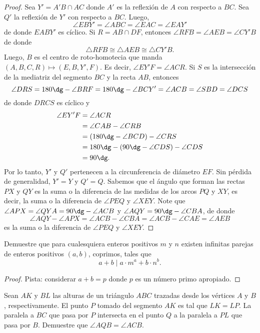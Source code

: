 \begin{proof}
	Sea $Y'=A'B\cap AC$ donde $A'$ es la reflexión de $A$ con respecto a $BC$. Sea $Q'$ la reflexión de $Y'$ con respecto a $BC$. Luego,
	\[\angle EBY'=\angle ABC=\angle EAC=\angle EAY'\]
	de donde $EABY'$ es cíclico. Si $R=AB\cap DF$, entonces $\angle RFB=\angle AEB=\angle CY'B$ de donde
	\[\triangle RFB\cong\triangle AEB\cong\triangle CY'B.\]
	Luego, $B$ es el centro de roto-homotecia que manda $(A,B,C,R)\mapsto(E,B,Y',F)$. Es decir, $\angle EY'F=\angle ACR$. Si $S$ es la intersección de la mediatriz del segmento $BC$ y la recta $AB$, entonces
	\[\angle DRS=180\dg-\angle BRF=180\dg-\angle BCY'=\angle ACB=\angle SBD=\angle DCS\]
	de donde $DRCS$ es cíclico y
	\begin{align*}
		\angle EY'F
		&=\angle ACR\\
		&=\angle CAB-\angle CRB\\
		&=(180\dg-\angle BCD)-\angle CRS\\
		&=180\dg-(90\dg-\angle CDS)-\angle CDS\\
		&=90\dg.
	\end{align*}
	Por lo tanto, $Y'$ y $Q'$ pertenecen a la circunferencia de diámetro $EF$. Sin pérdida de generalidad, $Y'=Y$ y $Q'=Q$. Sabemos que el ángulo que forman las rectas $PX$ y $QY$ es la suma o la diferencia de las medidas de los arcos $PQ$ y $XY$, es decir, la suma o la diferencia de $\angle PEQ$ y $\angle XEY$. Note que $\angle APX=\angle QYA=90\dg-\angle ACB$ y $\angle AQY=90\dg-\angle CBA$, de donde
	\[\angle AQY-\angle APX=\angle ACB-\angle CBA=\angle ACB-\angle CAE=\angle AEB\]
	es la suma o la diferencia de $\angle PEQ$ y $\angle XEY$.
\end{proof}


\begin{probMG}
	Demuestre que para cualesquiera enteros positivos $m$ y $n$ existen infinitas parejas de enteros positivos $(a,b)$, coprimos, tales que
	\[a+b\mid a\cdot m^a+b\cdot n^b.\]
\end{probMG}

\begin{proof}
	Pista: considerar $a+b=p$ donde $p$ es un número primo apropiado.
\end{proof}


\begin{probEG}
	Sean $AK$ y $BL$ las alturas de un triángulo $ABC$ trazadas desde los vértices $A$ y $B$, respectivamente. El punto $P$ tomado del segmento $AK$ es tal que $LK=LP$. La paralela a $BC$ que pasa por $P$ intersecta en el punto $Q$ a la paralela a $PL$ que pasa por $B$. Demuestre que $\angle AQB=\angle ACB$.
\end{probEG}

